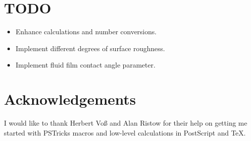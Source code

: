 \documentclass{scrartcl}
\begin{document}
\section{TODO}
\label{sec:todo}

\begin{itemize}
\item Enhance calculations and number conversions.
\item Implement different degrees of surface roughness.
\item Implement fluid film contact angle parameter.
\end{itemize}


\section{Acknowledgements}
\label{sec:acknowledgements}

I would like to thank Herbert Voß and Alan Ristow for their help on getting me
started with PSTricks macros and low-level calculations in PostScript and \TeX.
\end{document}
